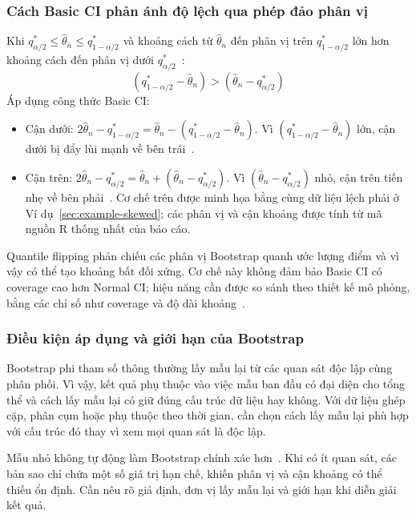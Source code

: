 \documentclass[12pt,a4paper]{article}
\theoremstyle{definition}
\numberwithin{equation}{section}
\begin{document}
\subsubsection{Cách Basic CI phản ánh độ lệch qua phép đảo phân vị}
	Khi $q_{\alpha/2}^*\le\hat\theta_n\le q_{1-\alpha/2}^*$ và khoảng cách từ $\hat{\theta}_n$ đến phân vị trên $q_{1-\alpha/2}^*$ lớn hơn khoảng cách đến phân vị dưới $q_{\alpha/2}^*$~\cite[tr. 197--199]{davison1997}:
	\begin{equation}
		(q_{1-\alpha/2}^* - \hat{\theta}_n) > (\hat{\theta}_n - q_{\alpha/2}^*)
	\end{equation}
	Áp dụng công thức Basic CI:
	\begin{itemize}
		\item Cận dưới: $2\hat{\theta}_n - q_{1-\alpha/2}^* = \hat{\theta}_n - (q_{1-\alpha/2}^* - \hat{\theta}_n)$. Vì $(q_{1-\alpha/2}^* - \hat{\theta}_n)$ lớn, cận dưới bị đẩy lùi mạnh về bên trái~\cite[tr. 197--199]{davison1997}.
		\item Cận trên: $2\hat{\theta}_n - q_{\alpha/2}^* = \hat{\theta}_n + (\hat{\theta}_n - q_{\alpha/2}^*)$. Vì $(\hat{\theta}_n - q_{\alpha/2}^*)$ nhỏ, cận trên tiến nhẹ về bên phải~\cite[tr. 197--199]{davison1997}.
			Cơ chế trên được minh họa bằng cùng dữ liệu lệch phải ở Ví dụ~\ref{sec:example-skewed}; các phân vị và cận khoảng được tính từ mã nguồn R thống nhất của báo cáo.
	\end{itemize}
	Quantile flipping phản chiếu các phân vị Bootstrap quanh ước lượng điểm và vì vậy có thể tạo khoảng bất đối xứng. Cơ chế này không đảm bảo Basic CI có coverage cao hơn Normal CI; hiệu năng cần được so sánh theo thiết kế mô phỏng, bằng các chỉ số như coverage và độ dài khoảng~\cite{efron1993,davison1997}.

\subsubsection{Điều kiện áp dụng và giới hạn của Bootstrap}

Bootstrap phi tham số thông thường lấy mẫu lại từ các quan sát độc lập cùng
phân phối. Vì vậy, kết quả phụ thuộc vào việc mẫu ban đầu có đại diện cho
tổng thể và cách lấy mẫu lại có giữ đúng cấu trúc dữ liệu hay không. Với dữ
liệu ghép cặp, phân cụm hoặc phụ thuộc theo thời gian, cần chọn cách lấy mẫu
lại phù hợp với cấu trúc đó thay vì xem mọi quan sát là độc lập.

Mẫu nhỏ không tự động làm Bootstrap chính xác hơn~\cite{efron1993,davison1997}. Khi có ít quan sát, các bản sao chỉ chứa một số giá trị hạn chế, khiến phân vị và cận khoảng có thể thiếu ổn định. Cần nêu rõ giả định, đơn vị lấy mẫu lại và giới hạn khi diễn giải kết quả.
\end{document}
